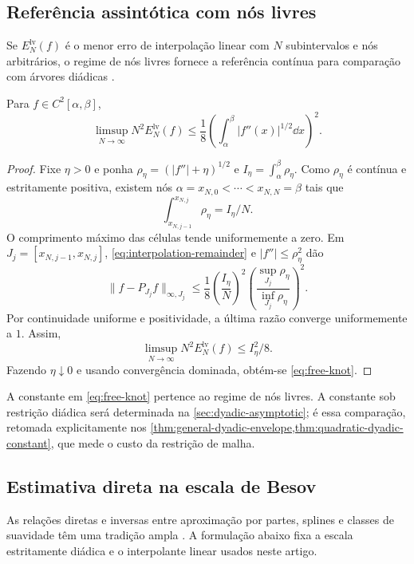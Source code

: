 \subsection{Referência assintótica com nós livres}

Se $E_N^{\mathrm{lv}}(f)$ é o menor erro de interpolação linear com $N$
subintervalos e nós arbitrários, o regime de nós livres fornece a referência
contínua para comparação com árvores diádicas
\citep{deboor1973variable,burchard1974,deboor2001,powell1981,schumaker2007}.

\begin{theorem}\label{thm:free-knots}
Para $f\in C^2[\alpha,\beta]$,
\begin{equation}
 \limsup_{N\to\infty}N^2E_N^{\mathrm{lv}}(f)
 \le\frac18\left(\int_\alpha^\beta |f''(x)|^{1/2}\dd x\right)^2.
 \label{eq:free-knot}
\end{equation}
\end{theorem}

\begin{proof}
Fixe $\eta>0$ e ponha $\rho_\eta=(|f''|+\eta)^{1/2}$ e $I_\eta=\int_\alpha^\beta\rho_\eta$. Como $\rho_\eta$ é contínua e estritamente positiva, existem nós $\alpha=x_{N,0}<\cdots<x_{N,N}=\beta$ tais que
\[
 \int_{x_{N,j-1}}^{x_{N,j}}\rho_\eta=I_\eta/N.
\]
O comprimento máximo das células tende uniformemente a zero. Em $J_j=[x_{N,j-1},x_{N,j}]$, \eqref{eq:interpolation-remainder} e $|f''|\le\rho_\eta^2$ dão
\[
 \|f-P_{J_j}f\|_{\infty,J_j}
 \le\frac18\left(\frac{I_\eta}{N}\right)^2
 \left(\frac{\sup_{J_j}\rho_\eta}{\inf_{J_j}\rho_\eta}\right)^2.
\]
Por continuidade uniforme e positividade, a última razão converge uniformemente a $1$. Assim,
\[
 \limsup_{N\to\infty}N^2E_N^{\mathrm{lv}}(f)\le I_\eta^2/8.
\]
Fazendo $\eta\downarrow0$ e usando convergência dominada, obtém-se \eqref{eq:free-knot}.
\end{proof}

A constante em \eqref{eq:free-knot} pertence ao regime de nós livres. A
constante sob restrição diádica será determinada na
\cref{sec:dyadic-asymptotic}; é essa comparação, retomada explicitamente nos
\cref{thm:general-dyadic-envelope,thm:quadratic-dyadic-constant}, que mede o
custo da restrição de malha.

\subsection{Estimativa direta na escala de Besov}

As relações diretas e inversas entre aproximação por partes, splines e classes
de suavidade têm uma tradição ampla
\citep{birman1967,petrushev1988,devorepopov1988}. A formulação abaixo fixa a
escala estritamente diádica e o interpolante linear usados neste artigo.

